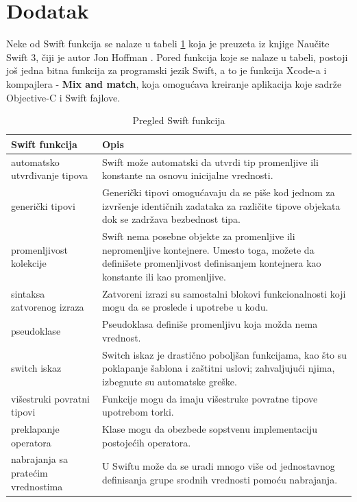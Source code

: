 \documentclass[a4paper]{article}
\begin{document}
\appendix
 



\appendix

\section{Dodatak}
\label{sec:dodatak}

Neke od Swift funkcija se nalaze u tabeli \ref{tab:funkcije} koja je preuzeta iz knjige Naučite Swift 3, čiji je autor Jon Hoffman \cite{mastering_swift3}. Pored funkcija koje se nalaze u tabeli, postoji još jedna bitna funkcija za programski jezik  Swift, a to je funkcija Xcode-a i kompajlera - \textbf{Mix and match}, koja  omogućava kreiranje aplikacija koje sadrže Objective-C i Swift fajlove.

\begin{table}[h!]
\centering
\caption{Pregled Swift funkcija}
\label{tab:funkcije}
\begin{tabular}{|p{3cm}|p{7cm}|} 

\hline
\textbf{Swift funkcija} & \textbf{Opis} \\ \hline
automatsko utvrđivanje   \hspace{10mm} tipova & Swift može automatski da utvrdi tip promenljive ili konstante na osnovu inicijalne
vrednosti. \\ \hline
generički tipovi & Generički tipovi omogućavaju da se piše kod jednom za izvršenje identičnih
zadataka za različite tipove objekata dok se zadržava bezbednost tipa. \\ \hline
promenljivost  kolekcije & Swift nema posebne objekte za promenljive ili nepromenljive kontejnere. Umesto
toga, možete da definišete promenljivost definisanjem kontejnera kao konstante
ili kao promenljive. \\ \hline
sintaksa zatvorenog izraza & Zatvoreni izrazi su samostalni blokovi funkcionalnosti koji mogu da se proslede i
upotrebe u kodu. \\ \hline
pseudoklase & Pseudoklasa definiše promenljivu koja možda nema vrednost. \\ \hline
switch iskaz &  Switch iskaz je drastično poboljšan funkcijama, kao što su poklapanje šablona i
zaštitni uslovi; zahvaljujući njima, izbegnute su automatske greške. \\ \hline
višestruki povratni tipovi &  Funkcije mogu da imaju višestruke povratne tipove upotrebom torki. \\ \hline
preklapanje  \hspace{10mm} operatora & Klase mogu da obezbede sopstvenu implementaciju postojećih operatora. \\ \hline
nabrajanja sa pratećim  \hspace{10mm} vrednostima & U Swiftu može da se uradi mnogo više od jednostavnog definisanja grupe srodnih
vrednosti pomoću nabrajanja. \\ \hline 

\end{tabular}
\end{table}
\end{document}
